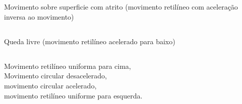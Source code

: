 \documentclass[12pt]{article}
\begin{document}
\section{}

\begin{multicols}{2}

\subsection{}
Movimento sobre superficie com atrito
(movimento retilíneo com aceleração inversa ao movimento)

\subsection{}
Queda livre (movimento retilíneo acelerado para baixo)

\subsection{}
Movimento retilíneo uniforma para cima,\\
Movimento circular desacelerado,\\
movimento circular acelerado,\\
movimento retilíneo uniforme para esquerda.

\end{multicols}

\setcounter{section}{3}

\section{}
\end{document}

